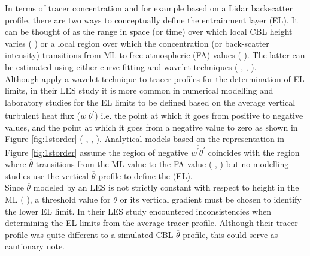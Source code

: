 In terms of tracer concentration and for example based on a Lidar backscatter profile, there are two ways to conceptually define the entrainment layer (\acs{EL}).  It can be thought of as the range in space (or time) over which local \acs{CBL} height varies (\citeauthor{CrumStullEl} \citeyear{CrumStullEl}) or a local region over which the concentration (or back-scatter intensity) transitions from \acs{ML} to free atmospheric (\acs{FA}) values (\citeauthor{Traum11} \citeyear{Traum11}).  The latter can be estimated using either curve-fitting and wavelet techniques (\citeauthor{Traum11} \citeyear{Traum11}, \citeauthor{SteynBaldHoff} \citeyear{SteynBaldHoff}, \citeauthor{BrooksFowler2} \citeyear{BrooksFowler2}).\\

Although \citeauthor{BrooksFowler2} apply a wavelet technique to tracer profiles for the determination of \acs{EL} limits, in their \citeyear{BrooksFowler2} \acs{LES} study it is more common in numerical modelling and laboratory studies for the \acs{EL} limits to be defined based on the average vertical turbulent heat flux ($\overline{w^{'}\theta^{'}}$) i.e. the point at which it goes from positive to negative values, and the point at which it goes from a negative value to zero as shown in Figure \ref{fig:1storder} (\citeauthor{DearWill80} \citeyear{DearWill80}, \citeauthor{FedConzMir04} \citeyear{FedConzMir04}, \citeauthor{GarciaMellado} \citeyear{GarciaMellado}). Analytical models based on the representation in Figure \ref{fig:1storder} assume the region of negative $\overline{w^{'}\theta^{'}}$ coincides with the region where $\overline{\theta}$ transitions from the \acs{ML} value to the \acs{FA} value (\citeauthor{Deardorff79} \citeyear{Deardorff79}, \citeauthor{FedConzMir04} \citeyear{FedConzMir04}) but no modelling studies use the vertical $\overline{\theta}$ profile to define the (\acs{EL}).\\

Since $\overline{\theta}$ modeled by an \acs{LES} is not strictly constant with respect to height in the \acs{ML} (\citeauthor{FedConzMir04} \citeyear{FedConzMir04}), a threshold value for $\overline{\theta}$ or its vertical gradient must be chosen to identify the lower \acs{EL} limit.  In their \citeyear{BrooksFowler2} \acs{LES} study \citeauthor{BrooksFowler2} encountered inconsistencies when determining the \acs{EL} limits from the average tracer profile.  Although their tracer profile was quite different to a simulated \acs{CBL} $\overline{\theta}$ profile, this could serve as cautionary note.\\             

